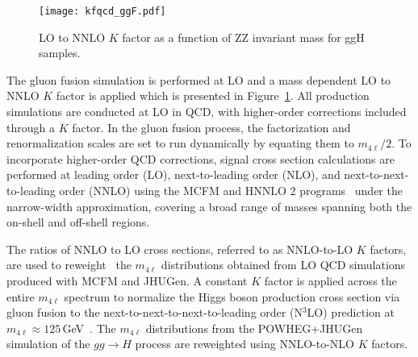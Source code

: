 
\begin{figure}[!hbt]
\centering
\texttt{[image: kfqcd\_ggF.pdf]}
\caption {LO to NNLO $K$ factor as a function of ZZ invariant mass for ggH samples.}
\label{fig:kfggf}
\end{figure}

The gluon fusion simulation is performed at LO and a mass dependent LO to NNLO $K$ factor is applied which is presented in Figure~\ref{fig:kfggf}. 
All \offshell production simulations are conducted at LO in QCD, with higher-order corrections 
included through a $K$ factor. In the gluon fusion process, the factorization and renormalization scales are set to run dynamically by equating them to $m_{4\ell}/2$. To incorporate higher-order QCD corrections, signal cross section calculations are performed at leading order (LO), next-to-leading order (NLO), and next-to-next-to-leading order (NNLO) using the MCFM and HNNLO 2 programs~\cite{Catani:2007vq,Grazzini:2008tf,Grazzini:2013mca} under the narrow-width approximation, covering a broad range of masses spanning both the on-shell and off-shell regions.

The ratios of NNLO to LO cross sections, referred to as NNLO-to-LO $K$ factors, are used to reweight~\cite{deFlorian:2016spz} the $m_{4\ell}$ distributions obtained from LO QCD simulations produced with MCFM and JHUGen. A constant $K$ factor 
is applied across the entire $m_{4\ell}$ spectrum to normalize the Higgs boson production cross section via gluon fusion to the next-to-next-to-next-to-leading order (N$^3$LO) prediction at $m_{4\ell} \approx 125$\,GeV~\cite{deFlorian:2016spz}. The $m_{4\ell}$ distributions from the POWHEG+JHUGen simulation of the $gg \to H$ process are reweighted using NNLO-to-NLO $K$ factors.

